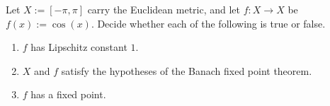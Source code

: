 \begin{exercise}
\label{ex:examHS24_TF_banach}
Let $X := [-\pi,\pi]$ carry the Euclidean metric, and let $f : X \to X$ be $f(x) := \cos(x)$. Decide whether
each of the following is true or false.
\begin{enumerate}[label=\textbf{(\alph*)}]
  \item $f$ has Lipschitz constant $1$.
  \item $X$ and $f$ satisfy the hypotheses of the Banach fixed point theorem.
  \item $f$ has a fixed point.
\end{enumerate}
\end{exercise}
